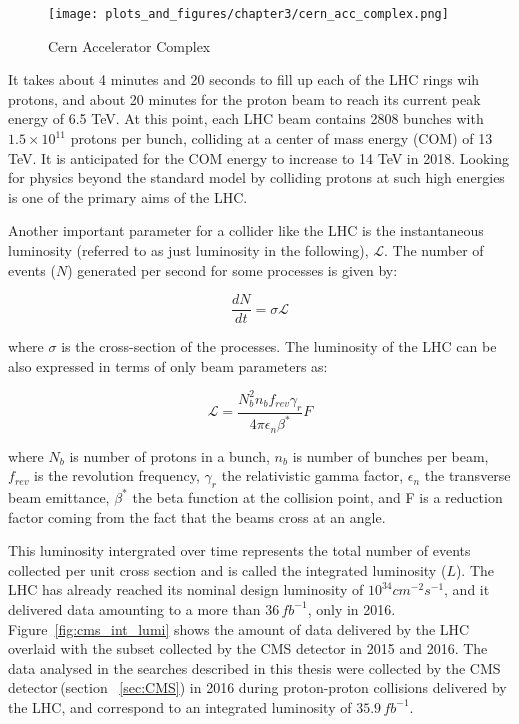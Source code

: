\begin{figure}
\begin{center}
\texttt{[image: plots\_and\_figures/chapter3/cern\_acc\_complex.png]}
\caption{Cern Accelerator Complex ~\cite{acc_complex}}
\label{fig:cern_acc_comp}
\end{center}
\end{figure}


It takes about 4 minutes and 20 seconds to fill up each of the LHC rings wih protons, and about 20 minutes for the proton beam to reach its current peak energy of 6.5 TeV. At this point, each LHC beam contains 2808 bunches with $1.5 \times 10^{11}$ protons per bunch, colliding at a center of mass energy (COM) of 13 TeV. It is anticipated for the COM energy to increase to 14 TeV in 2018. Looking for physics beyond the standard model by colliding protons at such high energies is one of the primary aims of the LHC.

Another important parameter for a collider like the LHC is the instantaneous luminosity (referred to as just luminosity in the following), $\mathscr{L}$. The number of events ($N$) generated per second for some processes is given by:

\begin{equation}
  \frac{dN}{dt}=\sigma\mathscr{L}
\end{equation}


where $\sigma$ is the cross-section of the processes. The luminosity of the LHC can be also expressed in terms of only beam parameters as:

\begin{equation}
  \mathscr{L}=\frac{N_{b}^2 n_{b} f_{rev} \gamma_{r}}{4 \pi \epsilon_{n}\beta^{*}} F
\end{equation}

where $N_{b}$ is number of protons in a bunch, $n_{b}$ is number of bunches per beam, $f_{rev}$ is the revolution frequency, $\gamma_{r}$ the relativistic gamma factor, $\epsilon_{n}$ the transverse beam emittance, $\beta^{*}$ the beta function at the collision point, and F is a reduction factor coming from the fact that the beams cross at an angle.


This luminosity intergrated over time represents the total number of events collected per unit cross section and is called the integrated luminosity ($L$). The LHC has already reached its nominal design luminosity of $10^{34} cm^{-2}s^{-1}$, and it delivered data amounting to a more than $36\,fb^{-1}$, only in 2016. Figure~\ref{fig:cms_int_lumi} shows the amount of data delivered by the LHC overlaid with the subset collected by the CMS detector in 2015 and 2016. The data analysed in the searches described in this thesis were collected by the CMS detector\,(section ~\ref{sec:CMS}) in 2016 during proton-proton collisions delivered by the LHC, and correspond to an integrated luminosity of $35.9\,fb^{-1}$.


